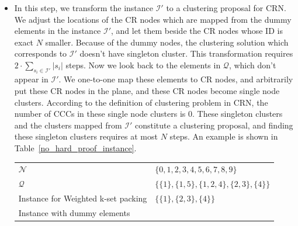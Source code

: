 \documentclass[10pt,journal,compsoc]{IEEEtran}
\makeatletter
\theoremstyle{mytheoremstyle}
\theoremstyle{mytheoremstyle}
\theoremstyle{mytheoremstyle}
\renewenvironment{proof}[1][\proofname]{%
      \par\pushQED{\qed}\fontfamily{ptm}\selectfont%
      \topsep6\p@\@plus6\p@\relax
      \trivlist\item[\hskip\labelsep\bfseries#1\@addpunct{.}]%
      \ignorespaces
    }{%
      \popQED\endtrivlist\@endpefalse
    }
\newcommand{\ie}{i.e., }
\makeatother
\begin{document}
\begin{proof}
\begin{itemize}
\item In this step, we transform the instance $\mathcal{I'}$ to a clustering proposal for CRN.
We adjust the locations of the CR nodes which are mapped from the dummy elements in the instance $\mathcal{I'}$, and let them beside the CR nodes whose ID is exact $N$ smaller.
Because of the dummy nodes, the clustering solution which corresponds to $\mathcal{I'}$ doesn't have singleton cluster.
This transformation requires $2\cdot\sum_{s_i \in \mathcal{I'}} |s_i|$ steps.
%
Now we look back to the elements in $\mathcal{Q}$, which don't appear in $\mathcal{I'}$. 
We one-to-one map these elements to CR nodes, and arbitrarily put these CR nodes in the plane, and these CR nodes become single node clusters.
According to the definition of clustering problem in CRN, the number of CCCs in these single node clusters is 0.
These singleton clusters and the clusters mapped from $\mathcal{I'}$ constitute a clustering proposal, and finding these singleton clusters requires at most $N$ steps.
%
An example is shown in Table~\ref{no_hard_proof_instance}.
\begin{table}[h!]
     \begin{center}
     \begin{tabular}{ p{3cm}  p{4.5cm} }
     \toprule
      $\mathcal{N}$  & $\{0, 1,2,3,4,5,6, 7, 8, 9\}$\\ 
    \cmidrule(r){1-1}\cmidrule(lr){2-2}     
      $\mathcal{Q}$  & $\{ \{1\}, \{1, 5\}, \{1,2,4\}, \{2,3\}, \{4\} \}$\\ 
    \cmidrule(r){1-1}\cmidrule(lr){2-2}     
      Instance for Weighted k-set packing  & $\{ \{1\}, \{2,3\}, \{4\} \}$\\ 
    \cmidrule(r){1-1}\cmidrule(lr){2-2}
      Instance with dummy elements

\end{tabular}
\end{center}
\end{table}
\end{itemize}
\end{proof}
\end{document}
